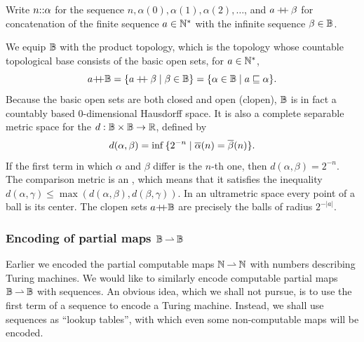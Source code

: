 Write $n {:}{:} \alpha$ for the sequence $n, \alpha(0), \alpha(1), \alpha(2), \ldots$, and $a \mathbin{{+}\!\!{+}} \beta$ for concatenation of the finite sequence $a \in \mathbb{N}^{*}$ with the infinite sequence $\beta \in \mathbb{B}$.

We equip $\mathbb{B}$ with the product topology, which is the topology whose countable topological base consists of the basic open sets, for $a \in \mathbb{N}^{*}$,
%
\begin{equation*}
  a{{+}\!\!{+}}\mathbb{B}
  = \{a \mathbin{{+}\!\!{+}} \beta \mid \beta \in \mathbb{B}\}
  = \{\alpha \in \mathbb{B} \mid a \sqsubseteq \alpha\}.
\end{equation*}
%
Because the basic open sets are both closed and open (clopen),
$\mathbb{B}$ is in fact a countably based $0$-dimensional Hausdorff space. It is also a complete
separable metric space for the  $d : \mathbb{B}
\times \mathbb{B} \to \mathbb{R}$, defined by
%
\begin{equation*}
  d(\alpha, \beta) = \inf \,\{2^{-n} \mid
    \overline{\alpha}(n) = \overline{\beta}(n)\}.
\end{equation*}
%
If the first term in which $\alpha$ and $\beta$ differ is the $n$-th
one, then $d(\alpha, \beta) = 2^{-n}$. The comparison metric is an
, which means that it satisfies the inequality $d(\alpha,
\gamma) \leq \max(d(\alpha, \beta), d(\beta, \gamma))$. In an ultrametric space every point of a ball is its center. The clopen sets $a{{+}\!\!{+}}\mathbb{B}$ are precisely the balls of radius $2^{-|a|}$.

\subsubsection{Encoding of partial maps $\mathbb{B} \mathbin{\rightharpoonup} \mathbb{B}$}
\label{sec:encoding-maps-baire}

Earlier we encoded the partial computable maps $\mathbb{N} \mathbin{\rightharpoonup} \mathbb{N}$ with numbers describing Turing machines. We would like to similarly encode computable partial maps $\mathbb{B} \mathbin{\rightharpoonup} \mathbb{B}$ with sequences. An obvious idea, which we shall not pursue, is to use the first term of a sequence to encode a Turing machine. Instead, we shall use sequences as ``lookup tables'', with which even some non-computable maps will be encoded.

